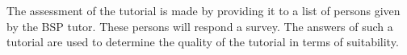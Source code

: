 
The assessment of the tutorial is made by providing it to a list of
persons given by the BSP tutor. These persons will respond a survey.
The answers of such a tutorial are used to determine the quality of
the tutorial in terms of suitability.
